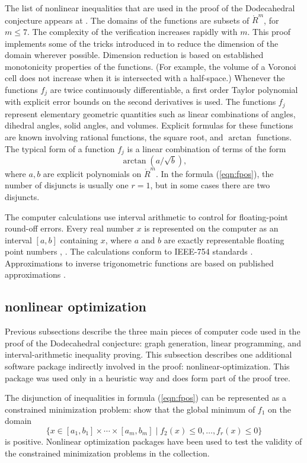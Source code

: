 The list of nonlinear inequalities that are used in the
proof of the Dodecahedral conjecture appears at \cite{code}.
The domains of the functions are subsets of $\ring{R}^m$, for
$m\le 7$.  The complexity of the verification increases
rapidly with $m$.  This proof implements  some of the tricks introduced
in \cite{DCG} to reduce the dimension of the domain wherever
possible.  Dimension reduction is based on established
monotonicity properties of the functions.  (For example, the
volume of a Voronoi cell does not increase when it is intersected
with a half-space.)  Whenever the functions $f_j$ are twice continuously
differentiable,  a first order Taylor polynomial with
explicit error bounds on the second derivatives is used. 
The functions $f_j$ represent elementary geometric quantities such
as linear combinations of angles, dihedral angles, solid angles,
and volumes.  Explicit formulas for these functions are known
involving rational functions, the square root, and $\arctan$ functions.
The typical form of a function $f_j$ is a linear combination of terms
of the form
    $$
    \arctan(a/\sqrt{b}),
    $$
where $a,b$ are explicit polynomials on $\ring{R}^m$.
In the 
formula (\ref{eqn:fpos}), the number of disjuncts is usually one
$r=1$, but in some cases there are two disjuncts.

The computer calculations use interval arithmetic to
control for floating-point round-off errors.  Every real number $x$
is represented on the computer as an interval $[a,b]$ containing $x$, where $a$ and $b$ are
exactly representable floating point numbers \cite{Interval}, \cite{Numerics}.
The calculations conform to IEEE-754 standards \cite{Float}.
Approximations to inverse trigonometric functions are based on 
published approximations \cite{Approx}.



\subsection{nonlinear optimization}

Previous subsections describe the three main pieces of computer
code used in the proof of the Dodecahedral conjecture: graph 
generation, linear programming, and interval-arithmetic inequality
proving.  This subsection describes one additional software
package indirectly involved in the proof: nonlinear-optimization.  
This package was used only in a heuristic way
and does form part of the proof tree.

The disjunction of inequalities in formula (\ref{eqn:fpos}) can
be represented as a constrained minimization problem: show that
the global minimum of $f_1$ on the domain
$$
\{x\in[a_1,b_1]\times\cdots\times[a_m,b_m] \mid  f_2(x)\le 0,\ldots,
  f_r(x)\le 0 \}
$$
is positive. Nonlinear optimization packages have been
used to test the validity of the constrained minimization
problems in the collection.

